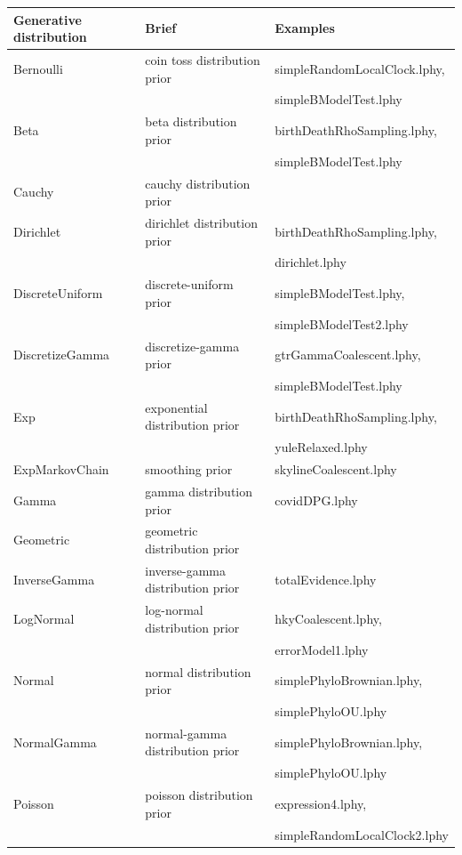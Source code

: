 \documentclass[12pt]{article} %
\begin{document}
\begin{table}
\footnotesize
\begin{tabular}{ l | p{7cm} | l }
    \hline\hline
    Generative distribution & Brief & Examples \\ 
    \hline\hline
    Bernoulli & coin toss distribution prior & simpleRandomLocalClock.lphy, \\ & & simpleBModelTest.lphy\\  
    Beta & beta distribution prior & birthDeathRhoSampling.lphy, \\ & & simpleBModelTest.lphy\\  
    Cauchy & cauchy distribution prior & \\  
    Dirichlet & dirichlet distribution prior & birthDeathRhoSampling.lphy, \\ & & dirichlet.lphy\\  
    DiscreteUniform & discrete-uniform prior & simpleBModelTest.lphy, \\ & & simpleBModelTest2.lphy\\  
    DiscretizeGamma &  discretize-gamma prior & gtrGammaCoalescent.lphy, \\ & & simpleBModelTest.lphy\\  
    Exp & exponential distribution prior & birthDeathRhoSampling.lphy, \\ & & yuleRelaxed.lphy\\  
    ExpMarkovChain & smoothing prior\cite{drummond2005bayesiansequences} & skylineCoalescent.lphy\\  
    Gamma & gamma distribution prior & covidDPG.lphy\\  
    Geometric & geometric distribution prior & \\  
    InverseGamma & inverse-gamma  distribution prior & totalEvidence.lphy\\  
    LogNormal & log-normal distribution prior & hkyCoalescent.lphy, \\ & & errorModel1.lphy\\  
    Normal & normal distribution prior & simplePhyloBrownian.lphy, \\ & & simplePhyloOU.lphy\\  
    NormalGamma & normal-gamma distribution prior & simplePhyloBrownian.lphy, \\ & & simplePhyloOU.lphy\\  
    Poisson & poisson distribution prior & expression4.lphy, \\ & & simpleRandomLocalClock2.lphy\\  

\end{tabular}
\end{table}
\end{document}

